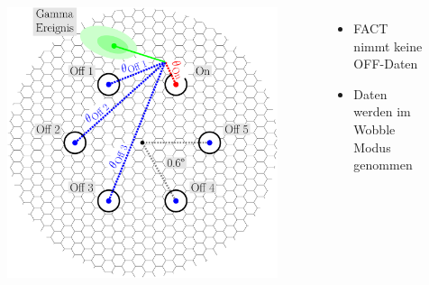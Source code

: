 \documentclass[aspectratio=1610, professionalfonts, 9pt]{beamer}
\begin{document}
\begin{frame}
  \begin{columns}
	\begin{figure}
	  \centering
	  \includegraphics[height=0.8\textheight]{./images/wobble.pdf}
	\end{figure}
	\begin{itemize}
	  \item FACT nimmt keine OFF-Daten
	  \item Daten werden im Wobble Modus genommen
	\end{itemize}
  \end{columns}
\end{frame}
\end{document}
